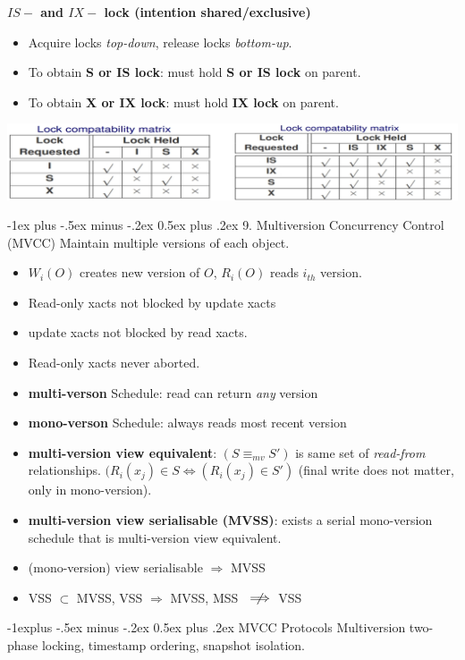 \documentclass[10pt, landscape]{article}
\makeatletter
\renewcommand{\section}{\@startsection{section}{1}{0mm}%
                                {-1ex plus -.5ex minus -.2ex}%
                                {0.5ex plus .2ex}%
                                {\normalfont\large\bfseries}}
\renewcommand{\subsection}{\@startsection{subsection}{2}{0mm}%
                                {-1explus -.5ex minus -.2ex}%
                                {0.5ex plus .2ex}%
                                {\normalfont\normalsize\bfseries}}
\makeatother
\begin{document}
\begin{multicols*}{3}
\textbf{$IS-$ and $IX-$ lock (intention shared/exclusive)}
\begin{itemize}
\item Acquire locks \textit{top-down}, release locks \textit{bottom-up}.
\item To obtain \textbf{S or IS lock}: must hold \textbf{S or IS lock} on parent.
\item To obtain \textbf{X or IX lock}: must hold \textbf{IX lock} on parent.
\end{itemize}
\centerline{\includegraphics[width = 0.95\linewidth]{lockCompatibility}}

\section{9. Multiversion Concurrency Control (MVCC)}
Maintain multiple versions of each object. 
\begin{itemize}
\item $W_i(O)$ creates new version of $O$, $R_i(O)$ reads $i_{th}$ version.
\item Read-only xacts not blocked by update xacts
\item update xacts not blocked by read xacts.
\item Read-only xacts never aborted.
\item \textbf{multi-verson} Schedule: read can return \textit{any} version
\item \textbf{mono-verson} Schedule: always reads most recent version
\item \textbf{multi-version view equivalent}: $(S \equiv_{mv} S')$ is same set of \textit{read-from} relationships. 
$(R_i(x_j) \in S  \Leftrightarrow (R_i(x_j) \in S')$ (final write does not matter, only in mono-version).
\item \textbf{multi-version view serialisable (MVSS)}: exists a serial mono-version schedule that is multi-version view equivalent.
\item (mono-version) view serialisable $\Rightarrow$ MVSS
\item VSS $\subset$ MVSS, VSS $\Rightarrow$ MVSS, MSS $\rlap{\(\quad\not\)}\implies$ VSS
\end{itemize}

\subsection{MVCC Protocols}
Multiversion two-phase locking, timestamp ordering, snapshot isolation.


\end{multicols*}
\end{document}
